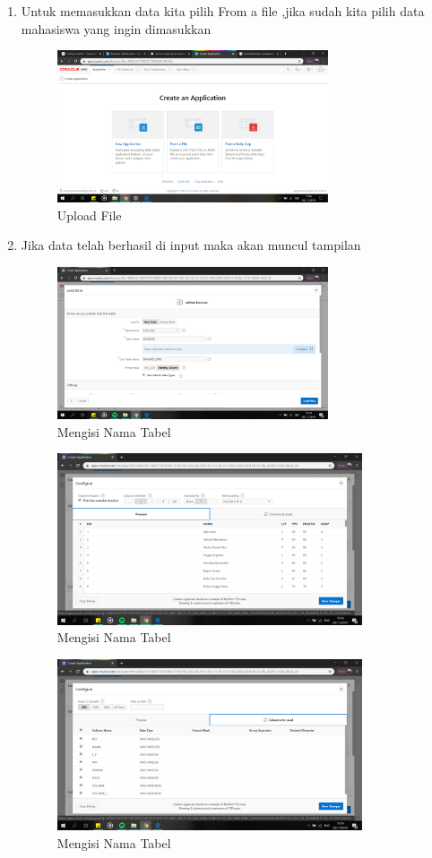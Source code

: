 \begin{enumerate}
\item  Untuk memasukkan data kita pilih From a file ,jika sudah kita pilih data mahasiswa yang ingin dimasukkan
    \begin{figure}[!htbp]
    \centering
    \includegraphics[width=8cm]{picture/09.png}
    \caption{Upload File}
    \end{figure}

\item Jika data telah berhasil di input maka akan muncul tampilan
    \begin{figure}[!htbp]
    \centering
    \includegraphics[width=8cm]{picture/04.png}
    \caption{Mengisi Nama Tabel}
    \end{figure}
    
    \begin{figure}[!htbp]
    \centering
    \includegraphics[width=9cm]{picture/05.png}
    \caption{Mengisi Nama Tabel}
    \end{figure}
    
    \begin{figure}[!htbp]
    \centering
    \includegraphics[width=9cm]{picture/06.png}
    \caption{Mengisi Nama Tabel}
    \end{figure}
    

\end{enumerate}
